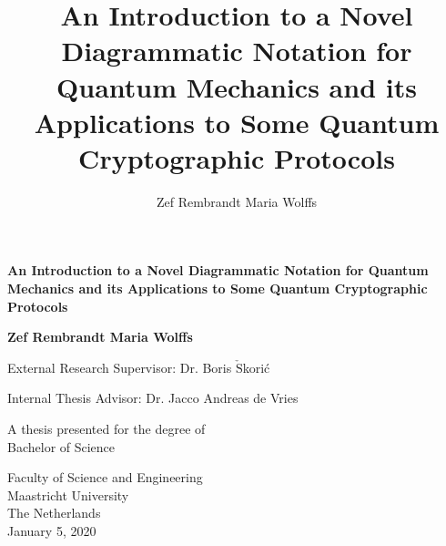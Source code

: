 \documentclass[]{article}
\title{An Introduction to a Novel Diagrammatic Notation for Quantum Mechanics and its Applications to Some Quantum Cryptographic Protocols}
\author{Zef Rembrandt Maria Wolffs}
\begin{document}
\begin{titlepage}
	\begin{center}
		\vspace*{1.0cm}
		
		\textbf{\large An Introduction to a Novel Diagrammatic Notation for Quantum Mechanics and its Applications to Some Quantum Cryptographic Protocols}
		
		\vspace{1.5cm}
		
		\textbf{Zef Rembrandt Maria Wolffs}
		
		\vfill
		
		External Research Supervisor: Dr. Boris $\check{\textrm{S}}$korić
		
		Internal Thesis Advisor: Dr. Jacco Andreas de Vries
		
		\vspace{1.0cm}
		
		A thesis presented for the degree of\\
		Bachelor of Science
		
		\vspace{1.0cm}
		
		
		Faculty of Science and Engineering\\
		Maastricht University\\
		The Netherlands\\
		January 5, 2020
		
	\end{center}
\end{titlepage}

\maketitle
\end{document}
